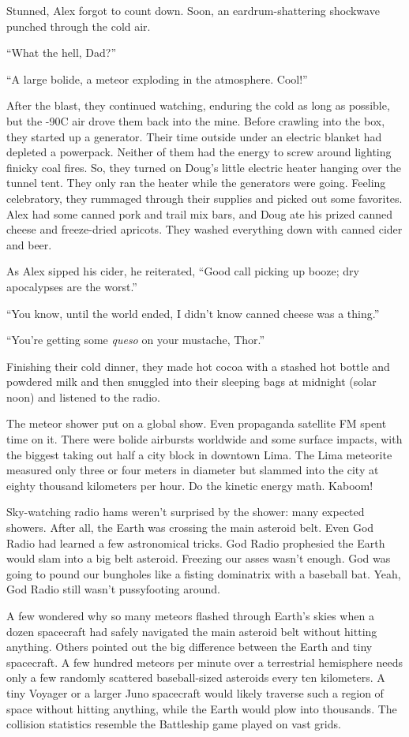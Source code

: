 Stunned, Alex forgot to count down. Soon, an eardrum-shattering
shockwave punched through the cold air.

``What the hell, Dad?''

``A large bolide, a meteor exploding in the atmosphere. Cool!''

After the blast, they continued watching, enduring the cold as long as
possible, but the -90C air drove them back into the mine. Before
crawling into the box, they started up a generator. Their time outside
under an electric blanket had depleted a powerpack. Neither of them had
the energy to screw around lighting finicky coal fires. So, they turned
on Doug's little electric heater hanging over the tunnel tent. They only
ran the heater while the generators were going. Feeling celebratory,
they rummaged through their supplies and picked out some favorites. Alex
had some canned pork and trail mix bars, and Doug ate his prized canned
cheese and freeze-dried apricots. They washed everything down with
canned cider and beer.

As Alex sipped his cider, he reiterated, ``Good call picking up booze;
dry apocalypses are the worst.''

``You know, until the world ended, I didn't know canned cheese was a
thing.''

``You're getting some \emph{queso} on your mustache, Thor.''

Finishing their cold dinner, they made hot cocoa with a stashed hot
bottle and powdered milk and then snuggled into their sleeping bags at
midnight (solar noon) and listened to the radio.

The meteor shower put on a global show. Even propaganda satellite FM
spent time on it. There were bolide airbursts worldwide and some surface
impacts, with the biggest taking out half a city block in downtown Lima.
The Lima meteorite measured only three or four meters in diameter but
slammed into the city at eighty thousand kilometers per hour. Do the
kinetic energy math. Kaboom!

Sky-watching radio hams weren't surprised by the shower: many expected
showers. After all, the Earth was crossing the main asteroid belt. Even
God Radio had learned a few astronomical tricks. God Radio prophesied
the Earth would slam into a big belt asteroid. Freezing our asses wasn't
enough. God was going to pound our bungholes like a fisting dominatrix
with a baseball bat. Yeah, God Radio still wasn't pussyfooting around.

A few wondered why so many meteors flashed through Earth's skies when a
dozen spacecraft had safely navigated the main asteroid belt without
hitting anything. Others pointed out the big difference between the
Earth and tiny spacecraft. A few hundred meteors per minute over a
terrestrial hemisphere needs only a few randomly scattered
baseball-sized asteroids every ten kilometers. A tiny Voyager or a
larger Juno spacecraft would likely traverse such a region of space
without hitting anything, while the Earth would plow into thousands. The
collision statistics resemble the Battleship game played on vast grids.


